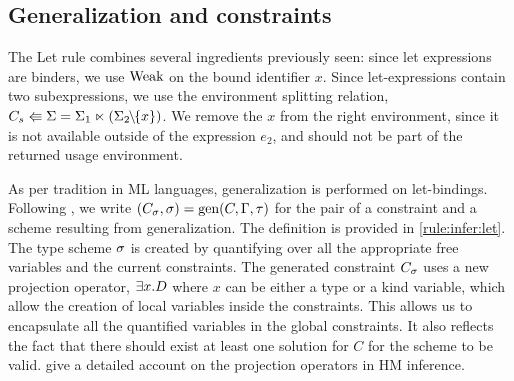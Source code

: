 \subsection{Generalization and constraints}
\label{infer:let}

The {\sc Let} rule combines several ingredients previously seen:
since let expressions are binders, we use $\operatorname{Weak}$ on the bound
identifier $x$. Since let-expressions contain
two subexpressions, we use the environment splitting relation,
$C_s \Lleftarrow \Sigma = \Sigma_1 \ltimes (\Sigma_2 \!\!\mathbin{\setminus}\!\!\{x\})$. We remove the $x$ from
the right environment, since it is not available outside of the expression
$e_2$, and should not be part of the returned usage environment.

As per tradition in ML languages, generalization is performed
on let-bindings.
Following \hmx, we write $(C_\sigma, \sigma) = \operatorname{\text{gen}}(C,\Gamma,\tau)$
for the pair of a constraint and a scheme resulting from
generalization. The definition is provided in \cref{rule:infer:let}.
The type scheme $\sigma$ is created by quantifying over all the appropriate
free variables and the current constraints.
The generated constraint $C_\sigma$ uses a new projection operator,
$\exists x.D$ where $x$ can be either a type or a kind variable, which
allow the creation of local variables inside the constraints.
This allows us to encapsulate all the quantified variables in the global constraints.
It also reflects the fact that there
should exist at least one solution for $C$ for the scheme to be valid.
\citet{DBLP:journals/tapos/OderskySW99} give a detailed account
on the projection operators in HM inference.







